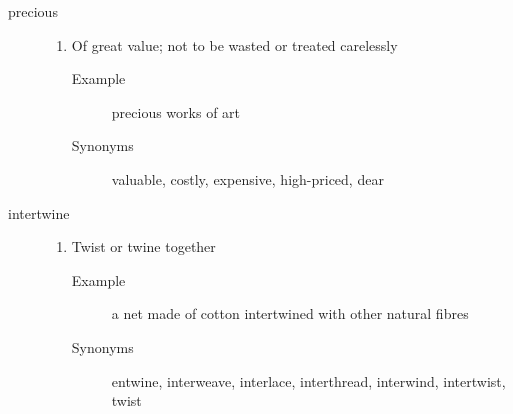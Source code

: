 \documentclass[12pt]{article}
\begin{document}
\begin{description}
\item[precious]
	\begin{enumerate}
	\item Of great value; not to be wasted or treated carelessly
		\begin{description}
		\item[Example] precious works of art
		\item[Synonyms] valuable, costly, expensive, high-priced, dear
		\end{description}
	\end{enumerate}
\item[intertwine]
	\begin{enumerate}
	\item Twist or twine together
		\begin{description}
		\item[Example] a net made of cotton intertwined with other natural fibres
		\item[Synonyms] entwine, interweave, interlace, interthread, interwind, intertwist, twist
		\end{description}
	\end{enumerate}
\end{description}
\end{document}
